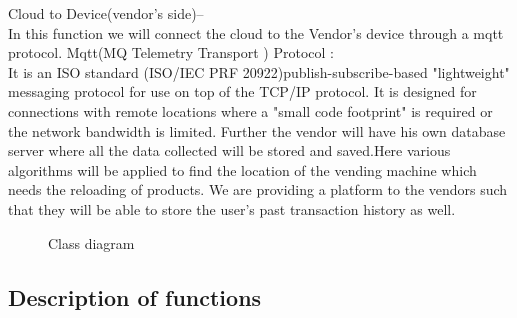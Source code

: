 \documentclass[oneside,a4paper,12pt]{report}
\begin{document}
Cloud to Device(vendor's side)--\\
In this function we will connect the cloud to the Vendor's device through a mqtt protocol.
Mqtt(MQ Telemetry Transport ) Protocol :\\
It is an ISO standard (ISO/IEC PRF 20922)publish-subscribe-based "lightweight" messaging protocol for use on top of the TCP/IP protocol. It is designed for connections with remote locations where a "small code footprint" is required or the network bandwidth is limited.
Further the vendor will have his own database server where all the data collected will be stored and saved.Here various algorithms will be applied to find the location of the vending machine which needs the reloading of products.
We are providing a platform to the vendors such that they will be able to store the user's past transaction history as well.\\


\begin{center}
	\begin{figure}[!htbp]
		\centering
	  \caption{Class diagram}
	  \label{fig:act-dig}
	\end{figure}
\end{center}  
\newpage 
\subsection{Description of functions}  
\end{document}
